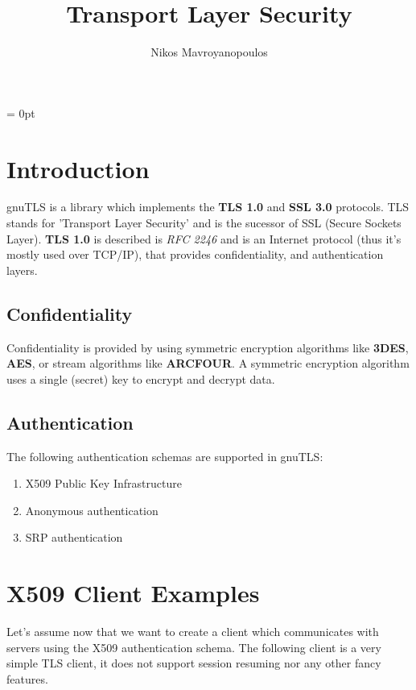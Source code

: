 \documentclass{article}
\begin{document}
\oddsidemargin=0pt
\marginparsep = 0pt
\marginparwidth=0pt
\textwidth=6cm

\title{Transport Layer Security}
\author{Nikos Mavroyanopoulos}
\maketitle

\section{Introduction}
\par
gnuTLS is a library which implements the {\bf TLS 1.0} and {\bf SSL 3.0} protocols.
TLS stands for 'Transport Layer Security' and is the sucessor of SSL (Secure Sockets Layer).
{\bf TLS 1.0} is described is {\it RFC 2246} and is an Internet protocol (thus it's mostly used over TCP/IP),
that provides confidentiality, and authentication layers. 

\subsection{Confidentiality}
\par
Confidentiality is provided by using symmetric encryption algorithms like {\bf 3DES}, {\bf AES}, or
stream algorithms like {\bf ARCFOUR}. A symmetric encryption algorithm uses a single (secret) key
to encrypt and decrypt data.

\subsection{Authentication}
\par
The following authentication schemas are supported in gnuTLS:
\begin{enumerate}
 \item X509 Public Key Infrastructure
 \item Anonymous authentication
 \item SRP authentication
\end{enumerate}



\section{X509 Client Examples}

Let's assume now that we want to create a client which communicates
with servers using the X509 authentication schema. The following client
is a very simple TLS client, it does not support session resuming nor
any other fancy features.
\end{document}
